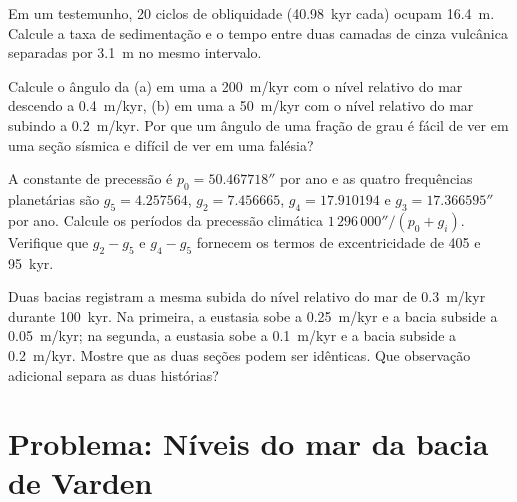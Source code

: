 \begin{exercise}[$\star\star$]\label{exo:b3:sequence-stratigraphy:9}
Em um testemunho, 20 ciclos de obliquidade (\qty{40.98}{kyr} cada) ocupam
\qty{16.4}{m}. Calcule a taxa de sedimentação e o tempo entre duas camadas de cinza vulcânica
separadas por \qty{3.1}{m} no mesmo intervalo.
\end{exercise}

\begin{exercise}[$\star\star\star$]\label{exo:b3:sequence-stratigraphy:10}
Calcule o ângulo da  (a) em uma  a
\qty{200}{m/kyr} com o nível relativo do mar descendo a \qty{0.4}{m/kyr}, (b) em
uma  a \qty{50}{m/kyr} com o nível relativo do mar subindo a
\qty{0.2}{m/kyr}. Por que um ângulo de uma fração de grau é fácil de ver em uma
seção sísmica e difícil de ver em uma falésia?
\end{exercise}

\begin{exercise}[$\star\star\star$]\label{exo:b3:sequence-stratigraphy:11}
A constante de precessão é $p_0 = 50.467718''$ por ano e as quatro
frequências planetárias são $g_5 = 4.257564$, $g_2 = 7.456665$, $g_4 = 17.910194$ e
$g_3 = 17.366595''$ por ano. Calcule os períodos da precessão climática
$1\,296\,000''/(p_0 + g_i)$. Verifique que $g_2 - g_5$ e $g_4 - g_5$ fornecem os
termos de excentricidade de 405 e \qty{95}{kyr}.
\end{exercise}

\begin{exercise}[$\star\star\star$]\label{exo:b3:sequence-stratigraphy:12}
Duas bacias registram a mesma subida do nível relativo do mar de \qty{0.3}{m/kyr} durante
\qty{100}{kyr}. Na primeira, a eustasia sobe a \qty{0.25}{m/kyr} e a
bacia subside a \qty{0.05}{m/kyr}; na segunda, a eustasia sobe a
\qty{0.1}{m/kyr} e a bacia subside a \qty{0.2}{m/kyr}. Mostre que as
duas seções podem ser idênticas. Que observação adicional separa as duas
histórias?
\end{exercise}

\section{Problema: Níveis do mar da bacia de Varden}

